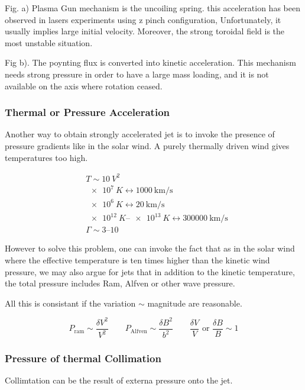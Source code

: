 \documentclass[10pt,a4paper,english,draft]{article}
\begin{document}

Fig. a) Plasma Gun mechanism is the uncoiling spring. this acceleration has been observed in lasers experiments using z pinch configuration, Unfortunately, it usually implies large initial velocity.
Moreover, the strong toroidal field is the most unstable situation.

Fig b). The poynting flux is converted into kinetic acceleration. This mechanism needs strong pressure 
in order to have  a large mass loading, and it is not available on the axis where rotation ceased. 

\subsubsection{Thermal or Pressure Acceleration}

Another way to obtain strongly accelerated jet is to invoke the presence of pressure gradients 
like in the solar wind. A purely thermally driven wind gives temperatures too high.

\begin{align*}
  & T \sim \SI{10}{V^2} \\
  & \SI{e7}{K} \leftrightarrow	  \SI{1000}{\km\per \s } \\
  & \SI{e6}{K} \leftrightarrow \SI{20}{\km \per\s}  \\
  &\SIrange{e12}{e13}{K} \leftrightarrow  \SI{300000}{\km \per \s} \\
  & \Gamma \sim \numrange{3}{10}
\end{align*}

However to solve this problem, one can invoke the fact that as in the solar wind where the
effective temperature is ten times higher than the kinetic wind pressure, we may also argue
for jets that in addition to the kinetic temperature, the total pressure includes Ram, Alfven
or other wave pressure.


All this is consistant if the variation $\sim$ magnitude are reasonable.

\begin{equation}
P_\mathrm{ram} \sim \frac{\delta V^2}{V^2} \qquad
P_\mathrm{Alfven}	\sim \frac{\delta B^2}{b^2} \qquad
\frac{\delta V}{V } \text{ or } \frac{\delta B}{B} \sim 1
\end{equation}
\subsubsection{Pressure of thermal Collimation}
Collimtation can be the result of externa pressure onto the jet.
\end{document}

